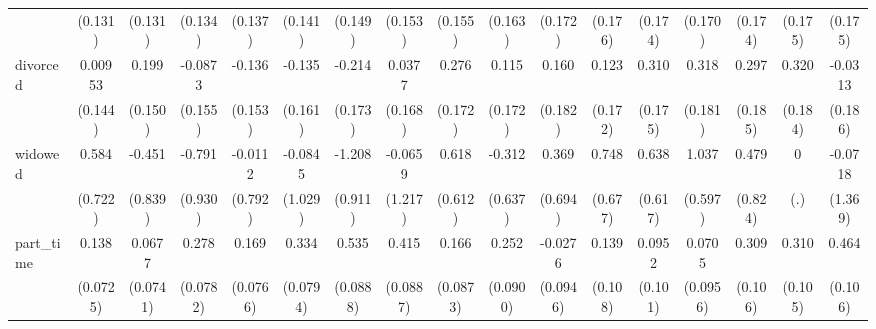 {\begin{tabular}{l*{16}{c}}
                    &     (0.131)         &     (0.131)         &     (0.134)         &     (0.137)         &     (0.141)         &     (0.149)         &     (0.153)         &     (0.155)         &     (0.163)         &     (0.172)         &     (0.176)         &     (0.174)         &     (0.170)         &     (0.174)         &     (0.175)         &     (0.175)         \\
[1em]
divorced            &     0.00953         &       0.199         &     -0.0873         &      -0.136         &      -0.135         &      -0.214         &      0.0377         &       0.276         &       0.115         &       0.160         &       0.123         &       0.310         &       0.318         &       0.297         &       0.320         &     -0.0313         \\
                    &     (0.144)         &     (0.150)         &     (0.155)         &     (0.153)         &     (0.161)         &     (0.173)         &     (0.168)         &     (0.172)         &     (0.172)         &     (0.182)         &     (0.172)         &     (0.175)         &     (0.181)         &     (0.185)         &     (0.184)         &     (0.186)         \\
[1em]
widowed             &       0.584         &      -0.451         &      -0.791         &     -0.0112         &     -0.0845         &      -1.208         &     -0.0659         &       0.618         &      -0.312         &       0.369         &       0.748         &       0.638         &       1.037         &       0.479         &           0         &     -0.0718         \\
                    &     (0.722)         &     (0.839)         &     (0.930)         &     (0.792)         &     (1.029)         &     (0.911)         &     (1.217)         &     (0.612)         &     (0.637)         &     (0.694)         &     (0.677)         &     (0.617)         &     (0.597)         &     (0.824)         &         (.)         &     (1.369)         \\
[1em]
part\_time           &       0.138         &      0.0677         &       0.278\sym{***}&       0.169\sym{*}  &       0.334\sym{***}&       0.535\sym{***}&       0.415\sym{***}&       0.166         &       0.252\sym{**} &     -0.0276         &       0.139         &      0.0952         &      0.0705         &       0.309\sym{**} &       0.310\sym{**} &       0.464\sym{***}\\
                    &    (0.0725)         &    (0.0741)         &    (0.0782)         &    (0.0766)         &    (0.0794)         &    (0.0888)         &    (0.0887)         &    (0.0873)         &    (0.0900)         &    (0.0946)         &     (0.108)         &     (0.101)         &    (0.0956)         &     (0.106)         &     (0.105)         &     (0.106)         \\

\end{tabular}}
